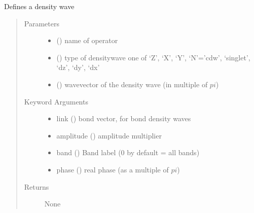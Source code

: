 \documentclass[letterpaper,10pt,english]{sphinxmanual}
\begin{document}
\begin{fulllineitems}
\label{\detokenize{functions:pyqcm.density_wave}}
\sphinxAtStartPar
Defines a density wave
\begin{quote}\begin{description}
\item[{Parameters}] \leavevmode\begin{itemize}
\item {} 
\sphinxAtStartPar
{} () \textendash{} name of operator

\item {} 
\sphinxAtStartPar
{} () \textendash{} type of density\sphinxhyphen{}wave \textendash{} one of ‘Z’, ‘X’, ‘Y’, ‘N’=’cdw’, ‘singlet’, ‘dz’, ‘dy’, ‘dx’

\item {} 
\sphinxAtStartPar
{} () \textendash{} wavevector of the density wave (in multiple of \(pi\))

\end{itemize}

\item[{Keyword Arguments}] \leavevmode\begin{itemize}
\item {} 
\sphinxAtStartPar
link (\sphinxstyleemphasis{{[}int{]}}) \textendash{} bond vector, for bond density waves

\item {} 
\sphinxAtStartPar
amplitude () \textendash{} amplitude multiplier

\item {} 
\sphinxAtStartPar
band () \textendash{} Band label (0 by default = all bands)

\item {} 
\sphinxAtStartPar
phase () \textendash{} real phase (as a multiple of \(pi\))

\end{itemize}

\item[{Returns}] \leavevmode
\sphinxAtStartPar
None

\end{description}\end{quote}

\end{fulllineitems}
\end{document}
